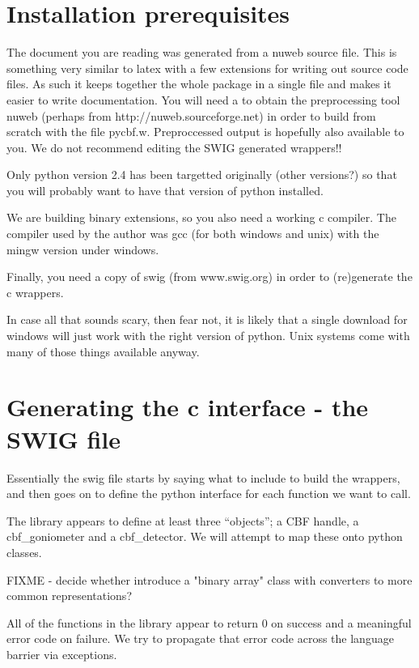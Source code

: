 \documentclass[10pt,a4paper,twoside,notitlepage]{article}
\begin{document}
\section{Installation prerequisites}

The document you are reading was generated from a nuweb source file. This
is something very similar to latex with a few extensions for writing out
source code files. As such it keeps together the whole package in a single file
and makes it easier to write documentation. You will need a to obtain the 
preprocessing tool nuweb (perhaps from http://nuweb.sourceforge.net) in
order to build from scratch with the file pycbf.w. Preproccessed output
is hopefully also available to you. 
We do not recommend editing the SWIG generated wrappers!!

Only python version 2.4 has been targetted originally (other versions?) so
that you will probably want to have that version of python installed.

We are building binary extensions, so you also need a working c compiler. 
The compiler used by the author was gcc (for both windows and unix) with
the mingw version under windows.

Finally, you need a copy of swig (from www.swig.org) in order to (re)generate
the c wrappers. 

In case all that sounds scary, then fear not, it is likely that a single download
for windows will just work with the right version of python. Unix systems
come with many of those things available anyway.

\section{Generating the c interface - the SWIG file}

Essentially the swig file starts by saying what to include to build the wrappers,
and then goes on to define the python interface for each function we want to call.

The library appears to define at least three ``objects''; a CBF handle, a cbf\_goniometer and
a cbf\_detector. We will attempt to map these onto python classes. 

FIXME - decide whether introduce a "binary array" class with converters to 
more common representations?

All of the functions in the library appear to return 0 on success and a 
meaningful error code on failure.
We try to propagate that error code across the language barrier via exceptions.
\end{document}
